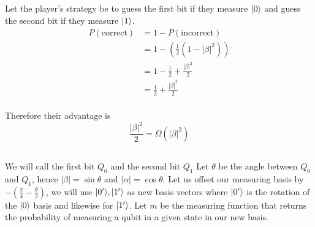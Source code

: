 \subsection{}
Let the player's strategy be to guess the first bit if they measure $\lvert0\rangle$ and guess the second bit if they measure $\lvert1\rangle$.
\begin{align*}
    P(\text{correct}) &= 1-P(\text{incorrect})\\
        &= 1-(\frac{1}{2}(1-|\beta|^2))\\
        &= 1-\frac{1}{2} + \frac{|\beta|^2}{2}\\
        &= \frac{1}{2} + \frac{|\beta|^2}{2}\\
\end{align*}

Therefore their advantage is 
\[\frac{|\beta|^2}{2} = \Omega(|\beta|^2)\]


\subsection{}
We will call the first bit $Q_0$ and the second bit $Q_1$
Let $\theta$ be the angle between $Q_0$ and $Q_1$, hence $|\beta|=\sin \theta$ and $|\alpha|= \cos \theta$.
Let us offset our measuring basis by $-(\frac{\pi}{4}-\frac{\theta}{2})$, we will use $\lvert0'\rangle,\lvert1'\rangle$ as new basis vectors where $\lvert0'\rangle$ is the rotation of the $\lvert0\rangle$ basis and likewise for $\lvert1'\rangle$.
Let $m$ be the measuring function that returns the probability of measuring a qubit in a given state in our new basis.

